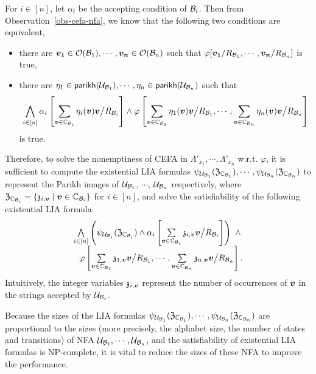 For $i \in [n]$, let $\alpha_i$ be the accepting condition of $\mathcal{B}_i$. 
Then from Observation~\ref{obs-cefa-nfa}, we know that the following two conditions are equivalent, 
\begin{itemize}

\item there are $\myvec{v_{1}} \in \cefaout(\cB_1), \cdots, \myvec{v_{n}} \in \cefaout(\cB_n)$ such that $\varphi[\myvec{v_{1}}/R_{\cB_{1}}, \cdots, \myvec{v_{n}}/R_{\cB_{n}}]$ is true, 
\item 
there are $\eta_1 \in \mathsf{parikh}(\mathcal{U}_{\mathcal{B}_1}), \cdots, \eta_n \in \mathsf{parikh}(\mathcal{U}_{\mathcal{B}_n})$ such that 
\[
\bigwedge \limits_{i \in [n]} \alpha_i\left[ \sum \limits_{\myvec{v} \in \costset_{\cB_i}} \eta_i(\myvec{v}) \myvec{v} \big{/}R_{\cB_i}  \right] \wedge \varphi \left[\sum \limits_{\myvec{v} \in \costset_{\cB_1}} \eta_1(\myvec{v}) \myvec{v} \big{/}R_{\cB_1}, \cdots, \sum \limits_{\myvec{v} \in \costset_{\cB_n}} \eta_n(\myvec{v}) \myvec{v} \big{/}R_{\cB_n} \right]
\]
is true. 
\end{itemize}

Therefore, to solve the nonemptiness of CEFA in $\Lambda'_{x_1}, \cdots, \Lambda'_{x_n}$ w.r.t. $\varphi$, it is sufficient to compute the existential LIA formulas $\psi_{\mathcal{U}_{\mathcal{B}_1}}(\mathfrak{Z}_{\mathbb{C}_{\mathcal{B}_1}}), \cdots, \psi_{\mathcal{U}_{\mathcal{B}_n}}(\mathfrak{Z}_{\mathbb{C}_{\mathcal{B}_n}})$ to represent the Parikh images of $\mathcal{U}_{\mathcal{B}_1}$, $\cdots$, $\mathcal{U}_{\mathcal{B}_n}$ respectively, where $\fZ_{\costset_{\cB_i}} = \{\anivarz_{i,\myvec{v}} \mid \myvec{v} \in \costset_{\cB_i}\}$ for $i \in [n]$, and solve the satisfiability of the following existential LIA formula
\[
\begin{array}{l}
\bigwedge \limits_{i \in [n]} \left(\psi_{\cU_{\cB_i}}(\fZ_{\costset_{\cB_i}}) \wedge \alpha_i\left[\sum\limits_{\myvec{v} \in \costset_{\cB_i}} \anivarz_{i, \myvec{v}} \myvec{v} \big{/}R_{\cB_i}  \right] \right)\  \wedge \\
\ \ \varphi \left[ \sum\limits_{\myvec{v} \in \costset_{\cB_1}} \anivarz_{1, \myvec{v}} \myvec{v} \big{/}R_{\cB_1}, \cdots, \sum\limits_{\myvec{v} \in \costset_{\cB_n}} \anivarz_{n, \myvec{v}} \myvec{v} \big{/}R_{\cB_n} \right].
\end{array}
\]
Intuitively, the integer variables $\anivarz_{i, \myvec{v}}$ represent the number of occurrences of $\myvec{v}$ in the strings accepted by $\mathcal{U}_{\mathcal{B}_i}$.

Because the sizes of the LIA formulas $\psi_{\mathcal{U}_{\mathcal{B}_1}}(\mathfrak{Z}_{\mathbb{C}_{\mathcal{B}_1}}), \cdots, \psi_{\mathcal{U}_{\mathcal{B}_n}}(\mathfrak{Z}_{\mathbb{C}_{\mathcal{B}_n}})$ are proportional to the sizes (more precisely, the alphabet size, the number of states and transitions) of NFA $\mathcal{U}_{\mathcal{B}_1}, \cdots, \mathcal{U}_{\mathcal{B}_n}$, and the satisfiability of existential LIA formulas is NP-complete, it is vital to reduce the sizes of these NFA to improve the performance.

